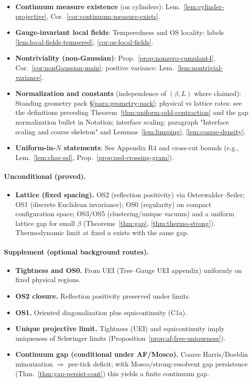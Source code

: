 \documentclass[11pt]{amsart}
\theoremstyle{plain}
\theoremstyle{definition}
\theoremstyle{remark}
\begin{document}
\begin{itemize}
  \item \textbf{Continuum measure existence} (on cylinders): Lem.~\ref{lem:cylinder-projective}, Cor.~\ref{cor:continuum-measure-exists}.
  \item \textbf{Gauge-invariant local fields}: Temperedness and OS locality: labels \ref{lem:local-fields-tempered}, \ref{cor:os-local-fields}.
  \item \textbf{Nontriviality (non-Gaussian)}: Prop.~\ref{prop:nonzero-cumulant4}, Cor.~\ref{cor:nonGaussian-main}; positive variance: Lem.~\ref{lem:nontrivial-variance}.
  \item \textbf{Normalization and constants} (independence of $(\beta,L)$ where claimed): Standing geometry pack \S\ref{para:geometry-pack}; physical vs lattice rates: see the definitions preceding Theorem~\ref{thm:uniform-odd-contraction} and the gap normalization bullet in Notation; interface scaling: paragraph "Interface scaling and coarse skeleton" and Lemmas~\ref{lem:lumping}, \ref{lem:coarse-density}.
  \item \textbf{Uniform-in-$N$ statements}: See Appendix R4 and cross-cut bounds (e.g., Lem.~\ref{lem:char-pd}, Prop.~\ref{prop:psd-crossing-gram}).
\end{itemize}

\paragraph{Unconditional (proved).}
\begin{itemize}
  \item \textbf{Lattice (fixed spacing).} OS2 (reflection positivity) via Osterwalder--Seiler; OS1 (discrete Euclidean invariance); OS0 (regularity) on compact configuration space; OS3/OS5 (clustering/unique vacuum) and a uniform lattice gap for small $\beta$ (Theorems~\ref{thm:gap}, \ref{thm:thermo-strong}). Thermodynamic limit at fixed $a$ exists with the same gap.
\end{itemize}
\paragraph{Supplement (optional background routes).}
\begin{itemize}
  \item \textbf{Tightness and OS0.} From UEI (Tree--Gauge UEI appendix) uniformly on fixed physical regions.
  \item \textbf{OS2 closure.} Reflection positivity preserved under limits.
  \item \textbf{OS1.} Oriented diagonalization plus equicontinuity (C1a).
  \item \textbf{Unique projective limit.} Tightness (UEI) and equicontinuity imply uniqueness of Schwinger limits (Proposition~\ref{prop:af-free-uniqueness}).
  \item \textbf{Continuum gap (conditional under AF/Mosco).} Coarse Harris/Doeblin minorization $\Rightarrow$ per-tick deficit; with Mosco/strong-resolvent gap persistence (Thm.~\ref{thm:gap-persist-cont}) this yields a finite continuum gap.
\end{itemize}
\end{document}
